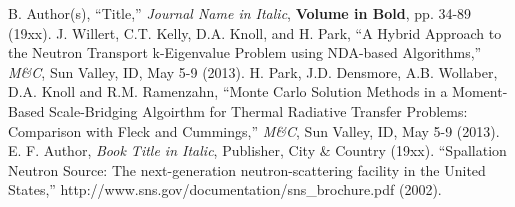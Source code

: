 \documentclass{mc2013}
\begin{document}
\setlength{\baselineskip}{12pt}
\begin{thebibliography}{300}
 B. Author(s), ``Title,'' {\it Journal Name in Italic}, 
          {\bf Volume in Bold}, pp. 34-89 (19xx).
 J. Willert, C.T. Kelly, D.A. Knoll, and H. Park,
         ``A Hybrid Approach to the Neutron Transport k-Eigenvalue Problem using
         NDA-based Algorithms,'' {\it M\&C}, Sun Valley, ID, May 5-9 (2013).
 H. Park, J.D. Densmore, A.B. Wollaber, D.A. Knoll and  R.M. Ramenzahn,
                ``Monte Carlo Solution Methods in a Moment-Based Scale-Bridging
                Algoirthm for Thermal Radiative Transfer Problems: Comparison with
                Fleck and Cummings,'' {\it M\&C}, Sun Valley, ID, May 5-9 (2013).
 E. F. Author, {\it Book Title in Italic}, Publisher, City \&
          Country (19xx). 
 ``Spallation Neutron Source: The next-generation 
          neutron-scattering facility in the United States,'' 
          http://www.sns.gov/documentation/sns\_brochure.pdf (2002).
\end{thebibliography}
\end{document}
